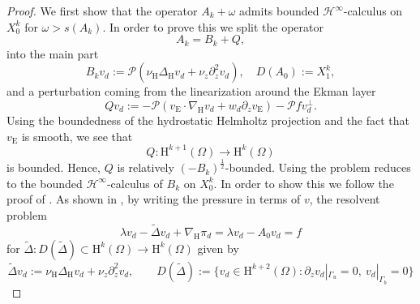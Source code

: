 \documentclass[preprint]{elsarticle}
\numberwithin{equation}{section}
\newcommand {\N}	{\mathbb{N}}
\DeclareMathOperator{\divH}{div_{\H}}
\renewcommand{\H}{\mathrm{H}}
\newcommand{\sigmabar}{\bar{\sigma}}
\newcommand{\dk}[1]{\partial_{#1}}
\newcommand{\dz}{\dk{z}}
\renewcommand{\bar}[1]{\overline{#1}}
\newcommand{\nablaH}{\nabla_{\H}}
\newcommand{\DeltaH}{\Delta_{\H}}
\newcommand{\rL}{\mathrm{L}}
\newcommand{\rH}{\H}
\newcommand{\rE}{\mathrm{E}}
\renewcommand{\P}{\mathcal{P}}
\begin{document}
\begin{proof}
	We first show that the operator $A_k+\omega$ admits bounded $\mathcal{H}^\infty$-calculus on $X_0^k$ for $\omega > s(A_k)$. 
	In order to prove this we split the operator
	\begin{equation*}
		A_k = B_k + Q,
	\end{equation*}
	into the main part 
	\begin{equation*}
		B_k v_d := \P ( \nu_{\rH} \DeltaH v_d +\nu_z \partial_z^2 v_d),
		\quad 
		D(A_0) := X_1^k ,
	\end{equation*}
	and a perturbation coming from the linearization around the Ekman layer 
	\begin{equation*}
		Q v_d := 	- \P (v_{\rE} \cdot \nablaH v_d 
		+ w_d \dz v_{\rE}) 
		- \P f v_d^\perp .
	\end{equation*}
	Using the boundedness of the hydrostatic Helmholtz projection and the fact that $v_{\rE}$ is smooth, we see that
	\begin{equation*}
		Q \colon \rH^{k+1}(\Omega) \to \rH^k(\Omega)
	\end{equation*} 
	is bounded. Hence, $Q$ is relatively $(-B_k)^{\frac{1}{2}}$-bounded. Using \cite[Corollary 3.3.15]{PS:16_2} the problem reduces to the bounded $\mathcal{H}^\infty$-calculus of $B_k$ on $X_0^k$. In order to show this we follow the proof of \cite{GGHHK:17_2}.
	As shown in \cite{GGHHK:17_2}, by writing the pressure in terms of $v$, the resolvent problem
	\begin{equation*}
		\lambda v_d - \tilde{\Delta}v_d + \nablaH \pi_d = \lambda v_d - A_0 v_d = f 
	\end{equation*}
	for $\tilde{\Delta} \colon D(\tilde{\Delta}) \subset \rH^k(\Omega) \to \rH^k(\Omega)$ given by
	\begin{equation*}
		\tilde{\Delta} v_d := \nu_{\H}\Delta_{\H} v_d+ \nu_z \dz^2 v_d,
		\qquad D(\tilde{\Delta}) := \bigl\{ v_d \in \rH^{k+2}(\Omega) \colon \partial_z v_d|_{\Gamma_u} = 0, \ v_d|_{\Gamma_b} = 0  \bigr\} 

\end{equation*}
\end{proof}
\end{document}
